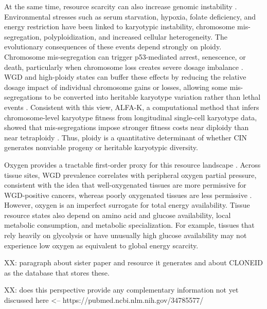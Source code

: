 \documentclass[11pt]{article}
\begin{document}
At the same time, resource scarcity can also increase genomic instability \cite{nowicka_interactions_2025,beck_energetics_2025}. Environmental stresses such as serum starvation, hypoxia, folate deficiency, and energy restriction have been linked to karyotypic instability, chromosome mis-segregation, polyploidization, and increased cellular heterogeneity. The evolutionary consequences of these events depend strongly on ploidy. Chromosome mis-segregation can trigger p53-mediated arrest, senescence, or death, particularly when chromosome loss creates severe dosage imbalance \cite{vitale_intratumor_2013,bakhoum_chromosomal_2012,thompson_proliferation_2010,sheltzer_single-chromosome_2017,silk_chromosome_2013}. WGD and high-ploidy states can buffer these effects by reducing the relative dosage impact of individual chromosome gains or losses, allowing some mis-segregations to be converted into heritable karyotype variation rather than lethal events \cite{lopez_interplay_2020,elizalde_markov_2018,santaguida_chromosome_2017}. Consistent with this view, ALFA-K, a computational method that infers chromosome-level karyotype fitness from longitudinal single-cell karyotype data, showed that mis-segregations impose stronger fitness costs near diploidy than near tetraploidy \cite{beck_alfa-k_2025}. Thus, ploidy is a quantitative determinant of whether CIN generates nonviable progeny or heritable karyotypic diversity.

Oxygen provides a tractable first-order proxy for this resource landscape \cite{nowicka_interactions_2025,beck_energetics_2025,donovan_hyperdiploid_2014}. Across tissue sites, WGD prevalence correlates with peripheral oxygen partial pressure, consistent with the idea that well-oxygenated tissues are more permissive for WGD-positive cancers, whereas poorly oxygenated tissues are less permissive \cite{donovan_hyperdiploid_2014,beck_energetics_2025}. However, oxygen is an imperfect surrogate for total energy availability. Tissue resource states also depend on amino acid and glucose availability, local metabolic consumption, and metabolic specialization. For example, tissues that rely heavily on glycolysis or have unusually high glucose availability may not experience low oxygen as equivalent to global energy scarcity.

XX: paragraph about sister paper and resource it generates and about CLONEID as the database that stores these.

XX: does this perspective provide any complementary information not yet discussed here <-- https://pubmed.ncbi.nlm.nih.gov/34785577/
\end{document}
